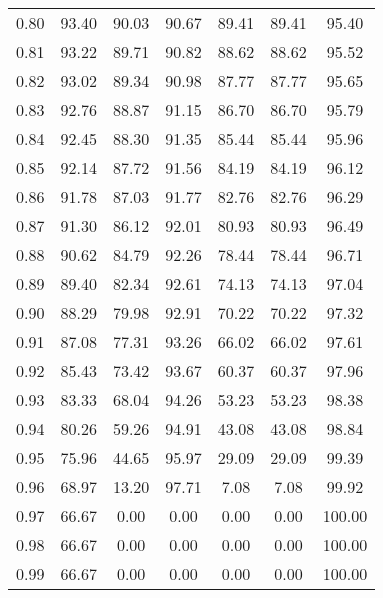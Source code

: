 \begin{tabular}{|c|c|c|c|c|c|c|}
      0.80 &     93.40 &     90.03 &      90.67 &   89.41 &      89.41 &         95.40 \\
      0.81 &     93.22 &     89.71 &      90.82 &   88.62 &      88.62 &         95.52 \\
      0.82 &     93.02 &     89.34 &      90.98 &   87.77 &      87.77 &         95.65 \\
      0.83 &     92.76 &     88.87 &      91.15 &   86.70 &      86.70 &         95.79 \\
      0.84 &     92.45 &     88.30 &      91.35 &   85.44 &      85.44 &         95.96 \\
      0.85 &     92.14 &     87.72 &      91.56 &   84.19 &      84.19 &         96.12 \\
      0.86 &     91.78 &     87.03 &      91.77 &   82.76 &      82.76 &         96.29 \\
      0.87 &     91.30 &     86.12 &      92.01 &   80.93 &      80.93 &         96.49 \\
      0.88 &     90.62 &     84.79 &      92.26 &   78.44 &      78.44 &         96.71 \\
      0.89 &     89.40 &     82.34 &      92.61 &   74.13 &      74.13 &         97.04 \\
      0.90 &     88.29 &     79.98 &      92.91 &   70.22 &      70.22 &         97.32 \\
      0.91 &     87.08 &     77.31 &      93.26 &   66.02 &      66.02 &         97.61 \\
      0.92 &     85.43 &     73.42 &      93.67 &   60.37 &      60.37 &         97.96 \\
      0.93 &     83.33 &     68.04 &      94.26 &   53.23 &      53.23 &         98.38 \\
      0.94 &     80.26 &     59.26 &      94.91 &   43.08 &      43.08 &         98.84 \\
      0.95 &     75.96 &     44.65 &      95.97 &   29.09 &      29.09 &         99.39 \\
      0.96 &     68.97 &     13.20 &      97.71 &    7.08 &       7.08 &         99.92 \\
      0.97 &     66.67 &      0.00 &       0.00 &    0.00 &       0.00 &        100.00 \\
      0.98 &     66.67 &      0.00 &       0.00 &    0.00 &       0.00 &        100.00 \\
      0.99 &     66.67 &      0.00 &       0.00 &    0.00 &       0.00 &        100.00 \\
\bottomrule
\end{tabular}
